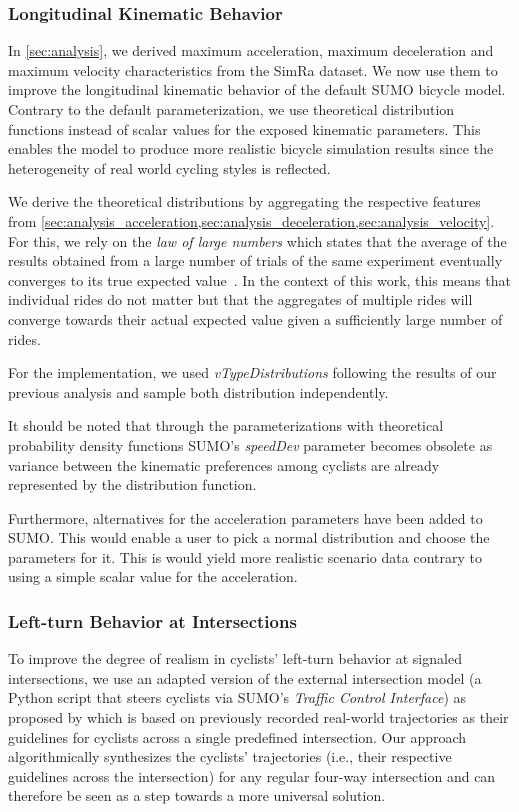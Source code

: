 \subsubsection{Longitudinal Kinematic Behavior}
\label{subsubsec:longitudinal_kinematic_behavior}
In \cref{sec:analysis}, we derived maximum acceleration, maximum deceleration and maximum velocity characteristics from the SimRa dataset.
We now use them to improve the longitudinal kinematic behavior of the default SUMO bicycle model.
Contrary to the default parameterization, we use theoretical distribution functions instead of scalar values for the exposed kinematic parameters.
This enables the model to produce more realistic bicycle simulation results since the heterogeneity of real world cycling styles is reflected.

We derive the theoretical distributions by aggregating the respective features from \cref{sec:analysis_acceleration,sec:analysis_deceleration,sec:analysis_velocity}.
For this, we rely on the \textit{law of large numbers} which states that the average of the results obtained from a large number of trials of the same experiment eventually converges to its true expected value~\cite{etemadi1981elementary}.
In the context of this work, this means that individual rides do not matter but that the aggregates of multiple rides will converge towards their actual expected value given a sufficiently large number of rides.

For the implementation, we used \textit{vTypeDistributions} following the results of our previous analysis and sample both distribution independently.

It should be noted that through the parameterizations with theoretical probability density functions SUMO's \textit{speedDev} parameter becomes obsolete as variance between the kinematic preferences among cyclists are already represented by the distribution function.

Furthermore, alternatives for the acceleration parameters have been added to SUMO. This would enable a user to pick a normal distribution and choose the parameters for it.
This is would yield more realistic scenario data contrary to using a simple scalar value for the acceleration.

\subsubsection{Left-turn Behavior at Intersections}
\label{subsubsec:left-turn_behavior_at_intersections}
To improve the degree of realism in cyclists' left-turn behavior at signaled intersections, we use an adapted version of the external intersection model (a Python script that steers cyclists via SUMO's \textit{Traffic Control Interface}) as proposed by \textcite{kaths2016integration} which is based on previously recorded real-world trajectories as their guidelines for cyclists across a single predefined intersection.
Our approach algorithmically synthesizes the cyclists' trajectories (i.e., their respective guidelines across the intersection) for any regular four-way intersection and can therefore be seen as a step towards a more universal solution.

